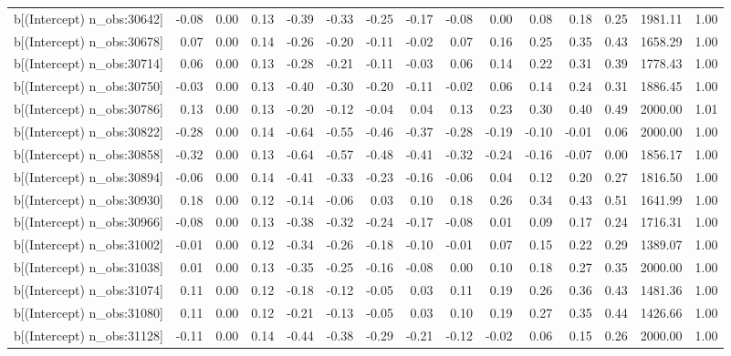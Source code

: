 \begin{table}[ht]
\begin{tabular}{rrrrrrrrrrrrrrr}
  b[(Intercept) n\_obs:30642] & -0.08 & 0.00 & 0.13 & -0.39 & -0.33 & -0.25 & -0.17 & -0.08 & 0.00 & 0.08 & 0.18 & 0.25 & 1981.11 & 1.00 \\ 
  b[(Intercept) n\_obs:30678] & 0.07 & 0.00 & 0.14 & -0.26 & -0.20 & -0.11 & -0.02 & 0.07 & 0.16 & 0.25 & 0.35 & 0.43 & 1658.29 & 1.00 \\ 
  b[(Intercept) n\_obs:30714] & 0.06 & 0.00 & 0.13 & -0.28 & -0.21 & -0.11 & -0.03 & 0.06 & 0.14 & 0.22 & 0.31 & 0.39 & 1778.43 & 1.00 \\ 
  b[(Intercept) n\_obs:30750] & -0.03 & 0.00 & 0.13 & -0.40 & -0.30 & -0.20 & -0.11 & -0.02 & 0.06 & 0.14 & 0.24 & 0.31 & 1886.45 & 1.00 \\ 
  b[(Intercept) n\_obs:30786] & 0.13 & 0.00 & 0.13 & -0.20 & -0.12 & -0.04 & 0.04 & 0.13 & 0.23 & 0.30 & 0.40 & 0.49 & 2000.00 & 1.01 \\ 
  b[(Intercept) n\_obs:30822] & -0.28 & 0.00 & 0.14 & -0.64 & -0.55 & -0.46 & -0.37 & -0.28 & -0.19 & -0.10 & -0.01 & 0.06 & 2000.00 & 1.00 \\ 
  b[(Intercept) n\_obs:30858] & -0.32 & 0.00 & 0.13 & -0.64 & -0.57 & -0.48 & -0.41 & -0.32 & -0.24 & -0.16 & -0.07 & 0.00 & 1856.17 & 1.00 \\ 
  b[(Intercept) n\_obs:30894] & -0.06 & 0.00 & 0.14 & -0.41 & -0.33 & -0.23 & -0.16 & -0.06 & 0.04 & 0.12 & 0.20 & 0.27 & 1816.50 & 1.00 \\ 
  b[(Intercept) n\_obs:30930] & 0.18 & 0.00 & 0.12 & -0.14 & -0.06 & 0.03 & 0.10 & 0.18 & 0.26 & 0.34 & 0.43 & 0.51 & 1641.99 & 1.00 \\ 
  b[(Intercept) n\_obs:30966] & -0.08 & 0.00 & 0.13 & -0.38 & -0.32 & -0.24 & -0.17 & -0.08 & 0.01 & 0.09 & 0.17 & 0.24 & 1716.31 & 1.00 \\ 
  b[(Intercept) n\_obs:31002] & -0.01 & 0.00 & 0.12 & -0.34 & -0.26 & -0.18 & -0.10 & -0.01 & 0.07 & 0.15 & 0.22 & 0.29 & 1389.07 & 1.00 \\ 
  b[(Intercept) n\_obs:31038] & 0.01 & 0.00 & 0.13 & -0.35 & -0.25 & -0.16 & -0.08 & 0.00 & 0.10 & 0.18 & 0.27 & 0.35 & 2000.00 & 1.00 \\ 
  b[(Intercept) n\_obs:31074] & 0.11 & 0.00 & 0.12 & -0.18 & -0.12 & -0.05 & 0.03 & 0.11 & 0.19 & 0.26 & 0.36 & 0.43 & 1481.36 & 1.00 \\ 
  b[(Intercept) n\_obs:31080] & 0.11 & 0.00 & 0.12 & -0.21 & -0.13 & -0.05 & 0.03 & 0.10 & 0.19 & 0.27 & 0.35 & 0.44 & 1426.66 & 1.00 \\ 
  b[(Intercept) n\_obs:31128] & -0.11 & 0.00 & 0.14 & -0.44 & -0.38 & -0.29 & -0.21 & -0.12 & -0.02 & 0.06 & 0.15 & 0.26 & 2000.00 & 1.00 \\ 

\end{tabular}
\end{table}
